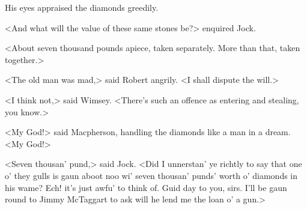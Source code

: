 His eyes appraised the diamonds greedily.

<And what will the value of these same stones be?> enquired Jock.

<About seven thousand pounds apiece, taken separately. More than that, taken together.>

<The old man was mad,> said Robert angrily. <I shall dispute the will.>

<I think not,> said Wimsey. <There's such an offence as entering and stealing, you know.>

<My God!> said Macpherson, handling the diamonds like a man in a dream. <My God!>

<Seven thousan' pund,> said Jock. <Did I unnerstan' ye richtly to say that one o' they gulls is gaun aboot noo wi' seven thousan' punds' worth o' diamonds in his wame? Ech! it's just awfu' to think of. Guid day to you, sirs. I'll be gaun round to Jimmy McTaggart to ask will he lend me the loan o' a gun.>

